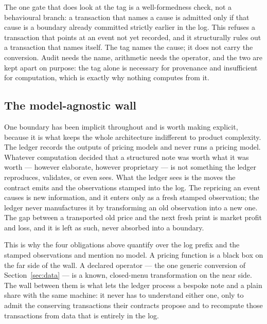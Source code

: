 The one gate that does look at the tag is a well-formedness check, not a behavioural
branch: a transaction that names a cause is admitted only if that cause is a
boundary already committed strictly earlier in the log. This refuses a transaction
that points at an event not yet recorded, and it structurally rules out a
transaction that names itself. The tag names the cause; it does not carry the
conversion. Audit needs the name, arithmetic needs the operator, and the two are
kept apart on purpose: the tag alone is necessary for provenance and insufficient
for computation, which is exactly why nothing computes from it.

\subsection{The model-agnostic wall}

One boundary has been implicit throughout and is worth making explicit, because it
is what keeps the whole architecture indifferent to product complexity. The ledger
records the outputs of pricing models and never runs a pricing model. Whatever
computation decided that a structured note was worth what it was worth --- however
elaborate, however proprietary --- is not something the ledger reproduces,
validates, or even sees. What the ledger sees is the moves the contract emits and
the observations stamped into the log. The repricing an event causes is new
information, and it enters only as a fresh stamped observation; the ledger never
manufactures it by transforming an old observation into a new one. The gap between
a transported old price and the next fresh print is market profit and loss, and it
is left as such, never absorbed into a boundary.

This is why the four obligations above quantify over the log prefix and the stamped
observations and mention no model. A pricing function is a black box on the far
side of the wall. A declared operator --- the one generic conversion of
Section~\ref{sec:data} --- is a known, closed-menu transformation on the near side.
The wall between them is what lets the ledger process a bespoke note and a plain
share with the same machine: it never has to understand either one, only to admit
the conserving transactions their contracts propose and to recompute those
transactions from data that is entirely in the log.
